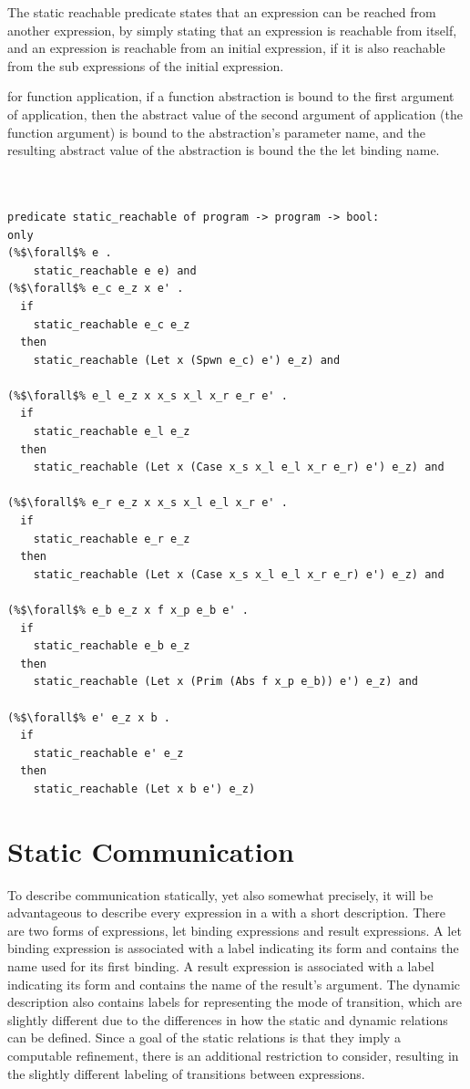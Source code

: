 \documentclass{article}
\begin{document}
The static reachable predicate states that an expression can be reached from another
expression, by simply stating that an expression is reachable from itself,  and an expression
is reachable from an initial expression, if it is also reachable from the sub expressions of
the initial expression.  

for function application, if a function abstraction is bound to the first argument of
application, then the abstract value of the second argument of application (the function
argument) is bound to the abstraction's parameter name, and the resulting abstract value of the
abstraction is bound the the let binding name.

\begin{lstlisting}[language=logic, escapechar=\%]


predicate static_reachable of program -> program -> bool:
only
(%$\forall$% e .
    static_reachable e e) and
(%$\forall$% e_c e_z x e' . 
  if
    static_reachable e_c e_z
  then
    static_reachable (Let x (Spwn e_c) e') e_z) and

(%$\forall$% e_l e_z x x_s x_l x_r e_r e' . 
  if
    static_reachable e_l e_z
  then
    static_reachable (Let x (Case x_s x_l e_l x_r e_r) e') e_z) and

(%$\forall$% e_r e_z x x_s x_l e_l x_r e' . 
  if
    static_reachable e_r e_z
  then
    static_reachable (Let x (Case x_s x_l e_l x_r e_r) e') e_z) and

(%$\forall$% e_b e_z x f x_p e_b e' . 
  if
    static_reachable e_b e_z
  then
    static_reachable (Let x (Prim (Abs f x_p e_b)) e') e_z) and

(%$\forall$% e' e_z x b . 
  if
    static_reachable e' e_z
  then
    static_reachable (Let x b e') e_z)

\end{lstlisting}


\section{Static Communication}

To describe communication statically, yet also somewhat precisely, it will be advantageous to
describe every expression in a with a short description.  There are two forms of expressions,
let binding expressions and result expressions.  A let binding expression is associated with a
label indicating its form and contains the name used for its first binding. A result
expression is associated with a label indicating its form and contains the name of the result's
argument.  The dynamic description also contains labels for representing the mode of
transition, which are slightly different due to the differences in how the static and dynamic
relations can be defined.  Since a goal of the static relations is that they imply a computable
refinement, there is an additional restriction to consider, resulting in the slightly different
labeling of transitions between expressions.    
\end{document}
